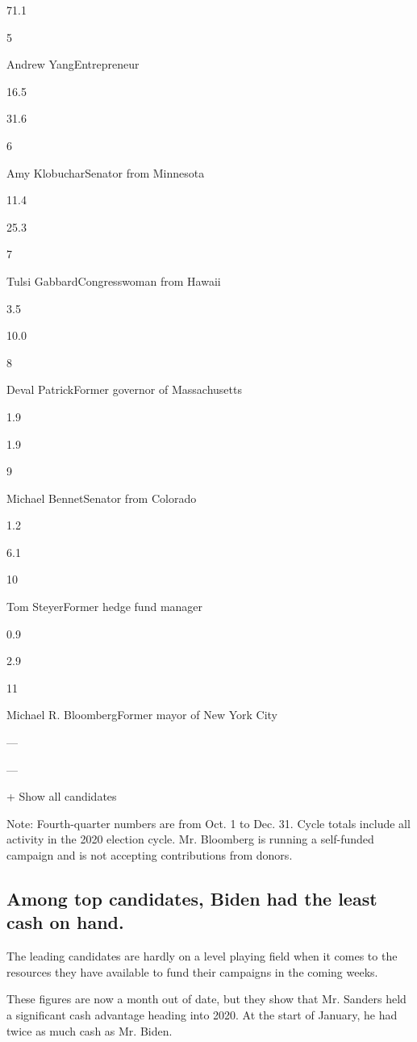 71.1

5

Andrew YangEntrepreneur

16.5

31.6

6

Amy KlobucharSenator from Minnesota

11.4

25.3

7

Tulsi GabbardCongresswoman from Hawaii

3.5

10.0

8

Deval PatrickFormer governor of Massachusetts

1.9

1.9

9

Michael BennetSenator from Colorado

1.2

6.1

10

Tom SteyerFormer hedge fund manager

0.9

2.9

11

Michael R. BloombergFormer mayor of New York City

---

---

+ Show all candidates

Note: Fourth-quarter numbers are from Oct. 1 to Dec. 31. Cycle totals
include all activity in the 2020 election cycle. Mr. Bloomberg is
running a self-funded campaign and is not accepting contributions from
donors.

\hypertarget{among-top-candidates-biden-had-the-least-cash-on-hand}{%
\subsection{Among top candidates, Biden had the least cash on
hand.}\label{among-top-candidates-biden-had-the-least-cash-on-hand}}

The leading candidates are hardly on a level playing field when it comes
to the resources they have available to fund their campaigns in the
coming weeks.

These figures are now a month out of date, but they show that Mr.
Sanders held a significant cash advantage heading into 2020. At the
start of January, he had twice as much cash as Mr. Biden.

